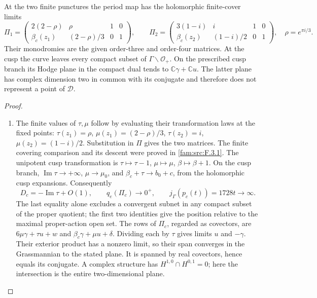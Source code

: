 \begin{proposition}\hypertarget{tag-01RF}{}\label{fam:src:F.3.2}\label{fam:st:F.3.2}

At the two finite punctures the period map has the holomorphic
finite-cover limits
\[
 \Pi_1=
 \begin{pmatrix}2(2-\rho)&\rho&1&0\\
 \beta_c(z_1)&(2-\rho)/3&0&1\end{pmatrix},\qquad
 \Pi_2=
 \begin{pmatrix}3(1-i)&i&1&0\\
 \beta_c(z_2)&(1-i)/2&0&1\end{pmatrix},
 \quad \rho=e^{\pi i/3}.
\]
Their monodromies are the given order-three and order-four matrices.
At the cusp the curve leaves every compact subset of
$\Gamma\backslash\mathcal O_+$.  On the prescribed cusp branch its
Hodge plane in the compact dual tends to
$\mathbb C\gamma+\mathbb Cu$.  The latter plane has complex dimension
two in common with its conjugate and therefore does not represent a
point of $\mathcal D$.
\end{proposition}



\begin{proof}
\begin{enumerate}[label=\arabic*.,leftmargin=*]
\item The finite values of $\tau,\mu$ follow by evaluating their transformation
laws at the fixed points: $\tau(z_1)=\rho$,
$\mu(z_1)=(2-\rho)/3$, $\tau(z_2)=i$,
$\mu(z_2)=(1-i)/2$.  Substitution in $\Pi$ gives the two matrices.
The finite covering comparison and its descent were proved in \ref{fam:src:F.3.1}.
The unipotent cusp transformation is
$\tau\mapsto\tau-1$, $\mu\mapsto\mu$, $\beta\mapsto\beta+1$.
On the cusp branch, $\operatorname{Im}\tau\to+\infty$,
$\mu\to\mu_0$, and $\beta_c+\tau\to b_0+c$, from the holomorphic
cusp expansions.  Consequently
\[
 D_c=-\operatorname{Im}\tau+O(1),\qquad
 q_e(\Pi_c)\longrightarrow0^+,
 \qquad j_\Gamma(p_c(t))=1728t\longrightarrow\infty.
\]
The last equality alone excludes a convergent subnet in any compact
subset of the proper quotient; the first two identities give the
position relative to the maximal proper-action open set.
The rows of $\Pi_c$, regarded as covectors, are
$6\mu\gamma+\tau u+w$ and $\beta_c\gamma+\mu u+\delta$.
Dividing each by $\tau$ gives limits $u$ and $-\gamma$.
Their exterior product has a nonzero limit, so their span converges
in the Grassmannian to the stated plane.  It is spanned by real
covectors, hence equals its conjugate.  A complex structure has
$H^{1,0}\cap H^{0,1}=0$; here the intersection is the entire
two-dimensional plane.
\end{enumerate}
\end{proof}